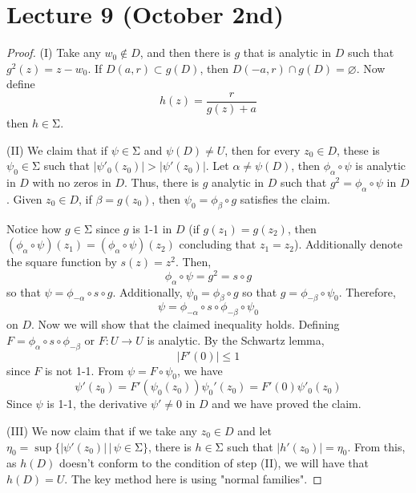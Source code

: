 \section{Lecture 9 (October 2nd)}
\begin{proof}
(I) Take any $w_0\notin D$, and then there is $g$ that is analytic in $D$ such that $g^2(z)=z-w_0$. If $D(a,r)\subset g(D)$, then $D(-a,r)\cap g(D)=\varnothing$. Now define 
\[h(z)=\dfrac{r}{g(z)+a}\]
then $h\in \mathrm{\Sigma} $.

\bigskip

(II) We claim that if $\psi \in \mathrm{\Sigma} $ and $\psi (D)\ne U$, then for every $z_0\in D$, these is $\psi_0\in \mathrm{\Sigma} $ such that $|\psi '_{0}(z_0)|>|\psi '(z_0)|$. Let $\alpha \ne \psi (D)$, then $\phi _{\alpha }\circ\psi $ is analytic in $D$ with no zeros in $D$. Thus, there is $g$ analytic in $D$ such that $g^2=\phi _{\alpha }\circ \psi $ in $D$. Given $z_0\in D$, if $\beta =g(z_0)$, then $\psi_0=\phi _{\beta }\circ g$ satisfies the claim.

\bigskip

Notice how $g\in \mathrm{\Sigma}$ since $g$ is 1-1 in $D$ (if $g(z_1)=g(z_2)$, then $(\phi _{\alpha }\circ\psi  )(z_1)=(\phi _{\alpha }\circ \psi )(z_2)$ concluding that $z_1=z_2$). Additionally denote the square function by $s(z)=z^2$. Then,
\[\phi _{\alpha }\circ \psi =g^2=s\circ g\]
so that $\psi =\phi _{-\alpha }\circ s\circ g$. Additionally, $\psi _{0}=\phi _{\beta }\circ g$ so that $g=\phi _{-\beta }\circ \psi _{0}$. Therefore,
\[\psi =\phi _{-\alpha }\circ s\circ\phi _{-\beta }\circ \psi _{0}\]
on $D$. Now we will show that the claimed inequality holds. Defining $F=\phi _{\alpha }\circ s\circ\phi _{-\beta }$ or $F:U\rightarrow U$ is analytic. By the Schwartz lemma,
\[|F'(0)|\leq 1\]
since $F$ is not 1-1. From $\psi =F\circ\psi _{0}$, we have 
\[\psi '(z_0)=F'(\psi _{0}(z_0))\psi _{0}'(z_0)=F'(0)\psi '_{0}(z_0)\]
Since $\psi $ is 1-1, the derivative $\psi'\ne 0$ in $D$ and we have proved the claim.

\bigskip

(III) We now claim that if we take any $z_0\in D$ and let $\eta _{0}=\sup\{|\psi '(z_0)|\,|\,\psi \in \mathrm{\Sigma} \}$, there is $h\in \mathrm{\Sigma} $ such that $|h'(z_0)|=\eta _{0}$. From this, as $h(D)$ doesn't conform to the condition of step (II), we will have that $h(D)=U$. The key method here is using "normal families". 
\end{proof}
\vspace{2ex}
